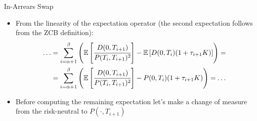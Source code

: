 \documentclass{beamer}
\begin{document}
\begin{frame}{In-Arrears Swap}
\begin{itemize}
\item From the linearity of the expectation operator (the second expectation follows from the ZCB definition):
\begin{equation*}
\begin{aligned}
\ldots &=\sum_{i=\alpha+1}^{\beta}\left(\mathbb{E}\left[\cfrac{D(0,T_{i+1})}{P(T_i,T_{i+1})^2}\right]-\mathbb{E}\left[D(0,T_i)(1+\tau_{i+1}K)\right]\right) = \\
&=\sum_{i=\alpha+1}^{\beta}\left(\mathbb{E}\left[\cfrac{D(0,T_{i+1})}{P(T_i,T_{i+1})^2}\right]-P(0,T_i)(1+\tau_{i+1}K)\right) = \ldots\\
\end{aligned}
\end{equation*}
\item Before computing the remaining expectation let's make a change of measure from the risk-neutral to $P(\cdot, T_{i+1})$
\end{itemize}
\end{frame}
\end{document}
